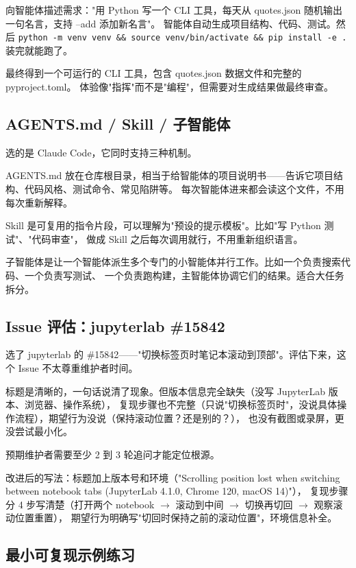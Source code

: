 \documentclass[a4paper,11pt]{ctexart}
\begin{document}
向智能体描述需求："用 Python 写一个 CLI 工具，每天从 quotes.json 随机输出一句名言，支持 --add 添加新名言"。
智能体自动生成项目结构、代码、测试。然后 \texttt{python -m venv venv \&\& source venv/bin/activate \&\& pip install -e .}
装完就能跑了。

最终得到一个可运行的 CLI 工具，包含 quotes.json 数据文件和完整的 pyproject.toml。
体验像"指挥"而不是"编程"，但需要对生成结果做最终审查。

\subsection{AGENTS.md / Skill / 子智能体}

选的是 Claude Code，它同时支持三种机制。

AGENTS.md 放在仓库根目录，相当于给智能体的项目说明书——告诉它项目结构、代码风格、测试命令、常见陷阱等。
每次智能体进来都会读这个文件，不用每次重新解释。

Skill 是可复用的指令片段，可以理解为"预设的提示模板"。比如"写 Python 测试"、"代码审查"，
做成 Skill 之后每次调用就行，不用重新组织语言。

子智能体是让一个智能体派生多个专门的小智能体并行工作。比如一个负责搜索代码、一个负责写测试、
一个负责跑构建，主智能体协调它们的结果。适合大任务拆分。

\subsection{Issue 评估：jupyterlab \#15842}

选了 jupyterlab 的 \#15842——"切换标签页时笔记本滚动到顶部"。评估下来，这个 Issue 不太尊重维护者时间。

标题是清晰的，一句话说清了现象。但版本信息完全缺失（没写 JupyterLab 版本、浏览器、操作系统），
复现步骤也不完整（只说"切换标签页时"，没说具体操作流程），期望行为没说（保持滚动位置？还是别的？），
也没有截图或录屏，更没尝试最小化。

预期维护者需要至少 2 到 3 轮追问才能定位根源。

改进后的写法：标题加上版本号和环境（"Scrolling position lost when switching between notebook tabs (JupyterLab 4.1.0, Chrome 120, macOS 14)"），
复现步骤分 4 步写清楚（打开两个 notebook $\to$ 滚动到中间 $\to$ 切换再切回 $\to$ 观察滚动位置重置），
期望行为明确写"切回时保持之前的滚动位置"，环境信息补全。

\subsection{最小可复现示例练习}
\end{document}
